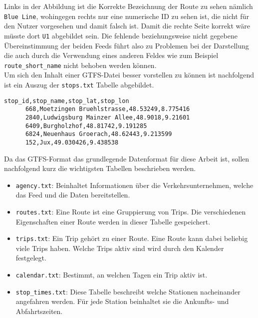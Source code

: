 \begin{newpage}
    Links in der Abbildung ist die Korrekte Bezeichnung der Route zu sehen nämlich \texttt{Blue Line}, wohingegen rechts nur eine numerische ID zu sehen ist, die nicht für den Nutzer vorgesehen und damit falsch ist. Damit die rechte Seite korrekt wäre müsste dort \texttt{U1} abgebildet sein. Die fehlende beziehungsweise nicht gegebene Übereinstimmung der beiden Feeds führt also zu Problemen bei der Darstellung die auch durch die Verwendung eines anderen Feldes wie zum Beispiel \texttt{route\_short\_name} nicht behoben werden können.\\

    Um sich den Inhalt einer GTFS-Datei besser vorstellen zu können ist nachfolgend ist ein Auszug der \texttt{stops.txt} Tabelle abgebildet.

    \begin{lstlisting}[captionpos=b, caption=Auszug der ersten Zeilen von \texttt{stops.txt}, label=lst:gtfs-auszug]
      stop_id,stop_name,stop_lat,stop_lon
      668,Moetzingen Bruehlstrasse,48.53249,8.775416
      2840,Ludwigsburg Mainzer Allee,48.9018,9.21601
      6409,Burgholzhof,48.81742,9.191285
      6824,Neuenhaus Groerach,48.62443,9.213599
      152,Jux,49.030426,9.438538
    \end{lstlisting}

		Da das GTFS-Format das grundlegende Datenformat für diese Arbeit ist, sollen nachfolgend kurz die wichtigsten Tabellen beschrieben werden.

		\begin{itemize}
			\item \texttt{agency.txt}: Beinhaltet Informationen über die Verkehrsunternehmen, welche das Feed und die Daten bereitstellen.

			\item \texttt{routes.txt}: Eine Route ist eine Gruppierung von Trips. Die verschiedenen Eigenschaften einer Route werden in dieser Tabelle gespeichert.

			\item \texttt{trips.txt}: Ein Trip gehört zu einer Route. Eine Route kann dabei beliebig viele Trips haben. Welche Trips aktiv sind wird durch den Kalender festgelegt.

			\item \texttt{calendar.txt}: Bestimmt, an welchen Tagen ein Trip aktiv ist.

			\item \texttt{stop\_times.txt}: Diese Tabelle beschreibt welche Stationen nacheinander angefahren werden. Für jede Station beinhaltet sie die Ankunfts- und Abfahrtszeiten.


\end{itemize}
\end{newpage}
